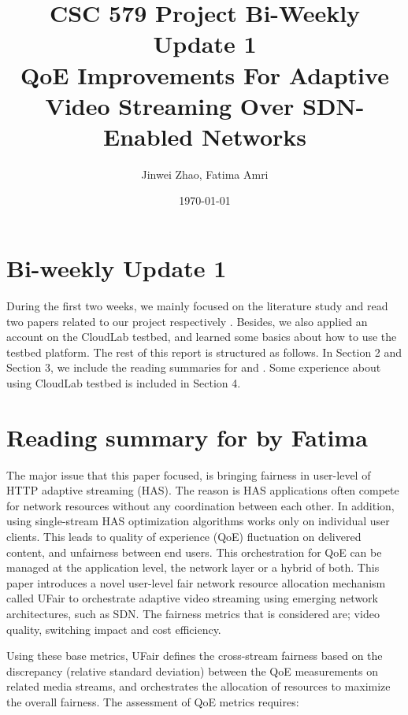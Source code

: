 \documentclass{article}
\begin{document}
\title{\textbf{CSC 579 Project Bi-Weekly Update 1 \protect\\ QoE Improvements For Adaptive Video Streaming Over SDN-Enabled Networks}}

\author{Jinwei Zhao, Fatima Amri}

\date{\today}

\maketitle

\section{Bi-weekly Update 1}
During the first two weeks, we mainly focused on the literature study and read two papers related to our project respectively \cite{mu_scalable_2016}\cite{bhat_network_2017}. Besides, we also applied an account on the CloudLab testbed, and learned some basics about how to use the testbed platform. The rest of this report is structured as follows. In Section 2 and Section 3, we include the reading summaries for \cite{mu_scalable_2016} and \cite{bhat_network_2017}. Some experience about using CloudLab testbed is included in Section 4. 

\section{Reading summary for \texorpdfstring{\cite{mu_scalable_2016}}, by Fatima}
The major issue that this paper focused, is bringing fairness in user-level of HTTP adaptive streaming (HAS). The reason is HAS applications often compete for network resources without any coordination between each other. In addition, using single-stream HAS optimization algorithms works only on individual user clients. This leads to quality of experience (QoE) fluctuation on delivered content, and unfairness between end users. This orchestration for QoE can be managed at the application level, the network layer or a hybrid of both. This paper introduces a novel user-level fair network resource allocation mechanism called UFair to orchestrate adaptive video streaming using emerging network architectures, such as SDN. The fairness metrics that is considered are; video quality, switching impact and cost efficiency. 

Using these base metrics, UFair defines the cross-stream fairness based on the discrepancy (relative standard deviation) between the QoE measurements on related media streams, and orchestrates the allocation of resources to maximize the overall fairness. The assessment of QoE metrics requires: 
\end{document}
